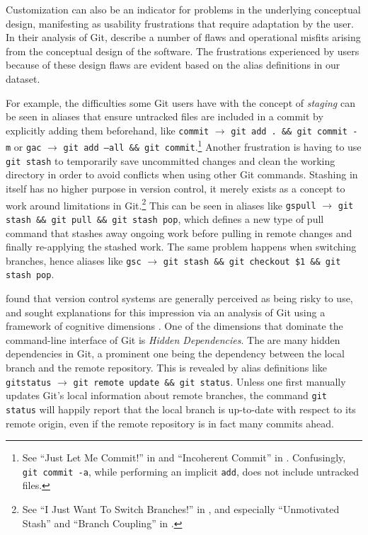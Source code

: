 \documentclass[smallextended,natbib]{svjour3}
\newcommand{\alias}[2]{{\texttt{#1} $\rightarrow$ \texttt{#2}}}
\begin{document}
Customization can also be an indicator for problems in the underlying conceptual design, manifesting as usability frustrations that require adaptation by the user.
In their analysis of Git, \cite{perez:13,perez:16} describe a number of flaws and operational misfits arising from the conceptual design of the software.
The frustrations experienced by users because of these design flaws are evident based on the alias definitions in our dataset.

For example, the difficulties some Git users have with the concept of \emph{staging} can be seen in aliases that ensure untracked files are included in a commit by explicitly adding them beforehand, like \alias{commit}{git add . \&\& git commit -m} or \alias{gac}{git add --all \&\& git commit}.\footnote{See ``Just Let Me Commit!'' in \cite{perez:13} and ``Incoherent Commit'' in \cite{perez:16}. Confusingly, \texttt{git commit -a}, while performing an implicit \texttt{add}, does not include untracked files.} Another frustration is having to use \texttt{git stash} to temporarily save uncommitted changes and clean the working directory in order to avoid conflicts when using other Git commands.
Stashing in itself has no higher purpose in version control, it merely exists as a concept to work around limitations in Git.\footnote{See ``I Just Want To Switch Branches!'' in \cite{perez:13}, and especially ``Unmotivated Stash'' and ``Branch Coupling'' in \cite{perez:16}.}
This can be seen in aliases like \alias{gspull}{git stash \&\& git pull \&\& git stash pop}, which defines a new type of pull command that stashes away ongoing work before pulling in remote changes and finally re-applying the stashed work.
The same problem happens when switching branches, hence aliases like \alias{gsc}{git stash \&\& git checkout \$1 \&\& git stash pop}.

\cite{church:14} found that version control systems are generally perceived as being risky to use, and sought explanations for this impression via an analysis of Git using a framework of cognitive dimensions \citep{green:96}.
One of the dimensions that dominate the command-line interface of Git is \emph{Hidden Dependencies}.
The are many hidden dependencies in Git, a prominent one being the dependency between the local branch and the remote repository.
This is revealed by alias definitions like \alias{gitstatus}{git remote update \&\& git status}.
Unless one first manually updates Git's local information about remote branches, the command \texttt{git status} will happily report that the local branch is up-to-date with respect to its remote origin, even if the remote repository is in fact many commits ahead.
\end{document}
